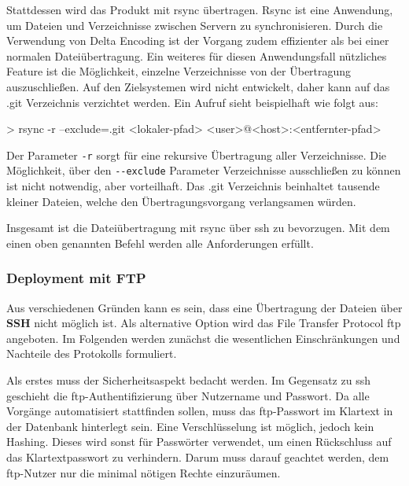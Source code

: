 Stattdessen wird das Produkt mit rsync übertragen. Rsync ist eine Anwendung, um Dateien und Verzeichnisse zwischen Servern zu synchronisieren. Durch die Verwendung von Delta Encoding ist der Vorgang zudem effizienter als bei einer normalen Dateiübertragung. Ein weiteres für diesen Anwendungsfall nützliches Feature ist die Möglichkeit, einzelne Verzeichnisse von der Übertragung auszuschließen. Auf den Zielsystemen wird nicht entwickelt, daher kann auf das .git Verzeichnis verzichtet werden. Ein Aufruf sieht beispielhaft wie folgt aus:

> rsync -r --exclude=.git <lokaler-pfad> <user>@<host>:<entfernter-pfad>

Der Parameter \lstinline!-r! sorgt für eine rekursive Übertragung aller Verzeichnisse. Die Möglichkeit, über den \lstinline!--exclude! Parameter Verzeichnisse ausschließen zu können ist nicht notwendig, aber vorteilhaft. Das .git Verzeichnis beinhaltet tausende kleiner Dateien, welche den Übertragungsvorgang verlangsamen würden.

Insgesamt ist die Dateiübertragung mit rsync über \gls{ssh} zu bevorzugen. Mit dem einen oben genannten Befehl werden alle Anforderungen erfüllt.


\subsubsection{Deployment mit FTP} %
\label{ssub:deployment_mit_ftp}

Aus verschiedenen Gründen kann es sein, dass eine Übertragung der Dateien über \textbf{SSH} nicht möglich ist. Als alternative Option wird das File Transfer Protocol \gls{ftp} angeboten. Im Folgenden werden zunächst die wesentlichen Einschränkungen und Nachteile des Protokolls formuliert.

Als erstes muss der Sicherheitsaspekt bedacht werden. Im Gegensatz zu \gls{ssh} geschieht die \gls{ftp}-Authentifizierung über Nutzername und Passwort. Da alle Vorgänge automatisiert stattfinden sollen, muss das \gls{ftp}-Passwort im Klartext in der Datenbank hinterlegt sein. Eine Verschlüsselung ist möglich, jedoch kein Hashing. Dieses wird sonst für Passwörter verwendet, um einen Rückschluss auf das Klartextpasswort zu verhindern. Darum muss darauf geachtet werden, dem \gls{ftp}-Nutzer nur die minimal nötigen Rechte einzuräumen.

